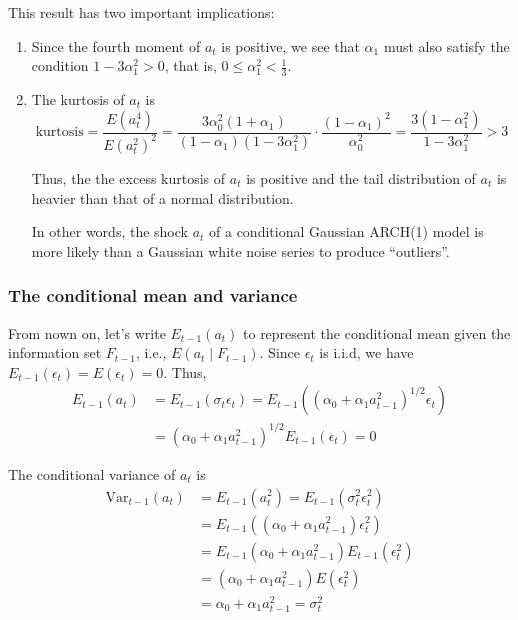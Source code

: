 \documentclass[a4paper,11pt]{article}
\newcommand{\var}{\mathrm{Var}}
\begin{document}
This result has two important implications:
\begin{enumerate}
\item Since the fourth moment of \(a_t\) is positive, we see that \(\alpha_1\) must
also satisfy the condition \(1-3\alpha_1^2 > 0\), that is, \(0 \leq
   \alpha^2_1 < \frac{1}{3}\).
\item The kurtosis of \(a_t\) is
\[\text{kurtosis} = \frac{E(a^4_t)}{E(a^2_t)^2} =
   \frac{3\alpha^2_0(1+\alpha_1)}{(1-\alpha_1)(1-3\alpha^2_1)} \cdot
   \frac{(1-\alpha_1)^2}{\alpha_0^2} =
   \frac{3(1-\alpha^2_1)}{1-3\alpha_1^2}  > 3\]

Thus, the the excess kurtosis of \(a_t\) is positive and the tail
distribution of \(a_t\) is heavier than that of a normal
distribution.

In other words, the shock \(a_t\) of a conditional Gaussian ARCH(1) model
is more likely than a Gaussian white noise series to produce
“outliers”.
\end{enumerate}

\subsubsection{The conditional mean and variance}
\label{sec:orga3d1e7a}

From nown on, let's write \(E_{t-1}(a_t)\) to represent the conditional mean given the
information set \(F_{t-1}\), i.e., \(E(a_t \mid F_{t-1})\).
Since \(\epsilon_t\) is i.i.d, we have \(E_{t-1}(\epsilon_t) =
E(\epsilon_t) = 0\). Thus,
\begin{equation*}
\begin{split}
E_{t-1}(a_t) &= E_{t-1}(\sigma_t \epsilon_t) = E_{t-1}\left((\alpha_0 + \alpha_1 a^2_{t-1})^{1/2} \epsilon_t\right) \\
&= (\alpha_0 + \alpha_1 a^2_{t-1})^{1/2} E_{t-1}(\epsilon_t) = 0
\end{split}
\end{equation*}

The conditional variance of \(a_t\) is
\begin{equation*}
\begin{split}
\var_{t-1}(a_t) &= E_{t-1}(a^2_t) = E_{t-1} \left( \sigma^2_t \epsilon_t^2 \right) \\
&= E_{t-1}\left((\alpha_0 + \alpha_1 a^2_{t-1}) \epsilon^2_t \right) \\
&= E_{t-1}(\alpha_0 + \alpha_1 a^2_{t-1}) E_{t-1}(\epsilon^2_t) \\
&= (\alpha_0 + \alpha_1 a^2_{t-1}) E(\epsilon^2_t) \\
&= \alpha_0 + \alpha_1 a^2_{t-1} = \sigma^2_t
\end{split}
\end{equation*}
\end{document}
